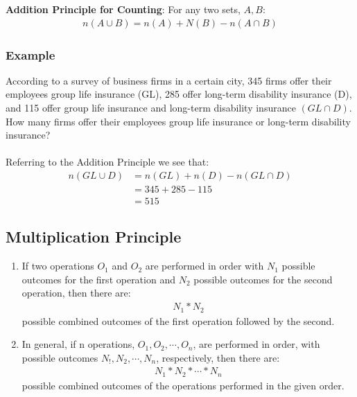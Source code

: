 \documentclass[14pt]{extarticle}
\begin{document}
\begin{tcolorbox}[enhanced jigsaw,colback=bg,boxrule=0pt,arc=0pt] 
	\textbf{Addition Principle for Counting}: For any two sets, $A,B$:
	\begin{align*}
		n(A\cup B) = n(A)+N(B) - n(A\cap B)
	\end{align*}
\end{tcolorbox}

\subsubsection{Example}
According to a survey of business firms in a certain city, 345 firms offer their employees group life insurance (GL), 285 offer long-term disability insurance (D), and 115 offer group life insurance and long-term disability insurance $(GL\cap D)$. How many firms offer their employees group life insurance or long-term disability insurance?
\\\\
Referring to the Addition Principle we see that:
\begin{align*}
	n(GL\cup D) &= n(GL)+n(D) - n(GL\cap D) \\
	&= 345 + 285 - 115 \\
	&= 515
\end{align*}

\subsection{Multiplication Principle}
\begin{tcolorbox}[enhanced jigsaw,colback=bg,boxrule=0pt,arc=0pt] 
	\begin{enumerate}
		\item If two operations $O_1$ and $O_2$ are performed in order with $N_1$ possible outcomes for the first operation and $N_2$ possible outcomes for the second operation, then there are:
		\begin{align*}
			N_1 * N_2
		\end{align*}
		possible combined outcomes of the first operation followed by the second.
		\item In general, if n operations, $O_1,O_2, \cdots, O_n$, are performed in order, with possible outcomes $N_!, N_2,\cdots,N_n$, respectively, then there are:
		\begin{align*}
			N_1 * N_2 * \cdots * N_n
		\end{align*}
		possible combined outcomes of the operations performed in the given order. 
	\end{enumerate}
\end{tcolorbox}
\end{document}
